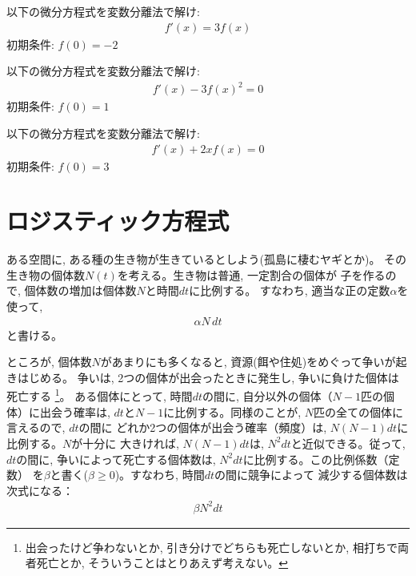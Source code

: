 \begin{q}\label{q:univ_diffeq_hensubunri00} 以下の微分方程式を変数分離法で解け:
\begin{eqnarray}f'(x)=3f(x)\label{eq:diffeq_hensubunri000}\end{eqnarray}
初期条件: $f(0)=-2$
\end{q}
\mv

\begin{q}\label{q:univ_diffeq_hensubunri0} 以下の微分方程式を変数分離法で解け:
\begin{eqnarray}f'(x)-3f(x)^2=0\label{eq:difex40}\end{eqnarray}
初期条件: $f(0)=1$
\end{q}
\mv

\begin{q}\label{q:univ_diffeq_hensubunri2} 以下の微分方程式を変数分離法で解け:
\begin{eqnarray}f'(x)+2xf(x)=0\label{eq:difex50}\end{eqnarray}
初期条件: $f(0)=3$
\end{q}
\mv



\section{ロジスティック方程式}\label{section:Logistic_eq}

ある空間に, ある種の生き物が生きているとしよう(孤島に棲むヤギとか)。
その生き物の個体数$N(t)$を考える。生き物は普通, 一定割合の個体が
子を作るので, 個体数の増加は個体数$N$と時間$dt$に比例する。
すなわち, 適当な正の定数$\alpha$を使って, 
\begin{eqnarray}
\alpha N\,dt\label{eq:Logistic1}
\end{eqnarray}
と書ける。

ところが, 個体数$N$があまりにも多くなると, 資源(餌や住処)をめぐって争いが起きはじめる。
争いは, 2つの個体が出会ったときに発生し, 争いに負けた個体は死亡する
\footnote{出会ったけど争わないとか, 引き分けでどちらも死亡しないとか, 
相打ちで両者死亡とか, そういうことはとりあえず考えない。}。
ある個体にとって, 時間$dt$の間に, 自分以外の個体（$N-1$匹の個体）に出会う確率は,
 $dt$と$N-1$に比例する。同様のことが, $N$匹の全ての個体に言えるので, $dt$の間に
どれか2つの個体が出会う確率（頻度）は, $N(N-1)dt$に比例する。$N$が十分に
大きければ, $N(N-1)dt$は, $N^2dt$と近似できる。従って, $dt$の間に, 
争いによって死亡する個体数は, $N^2dt$に比例する。この比例係数（定数）
を$\beta$と書く($\beta\geq0$)。すなわち, 時間$dt$の間に競争によって
減少する個体数は次式になる：
\begin{eqnarray}
\beta N^2 dt\label{eq:Logistic2}
\end{eqnarray}

